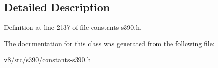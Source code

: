 \subsection{Detailed Description}


Definition at line 2137 of file constants-\/s390.\+h.



The documentation for this class was generated from the following file\+:\begin{DoxyCompactItemize}
\item 
v8/src/s390/constants-\/s390.\+h\end{DoxyCompactItemize}
